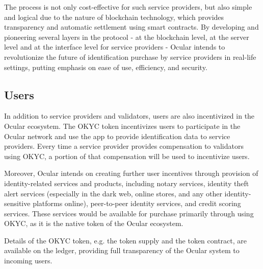 \documentclass[12pt]{article}
\begin{document}
The process is not only cost-effective for such service providers, but also simple and logical due to the nature of blockchain technology, which provides transparency and automatic settlement using smart contracts. By developing and pioneering several layers in the protocol - at the blockchain level, at the server level and at the interface level for service providers - Ocular intends to revolutionize the future of identification purchase by service providers in real-life settings, putting emphasis on ease of use, efficiency, and security.

\subsection{Users}
In addition to service providers and validators, users are also incentivized in the Ocular ecosystem. The OKYC token incentivizes users to participate in the Ocular network and use the app to provide identification data to service providers. Every time a service provider provides compensation to validators using OKYC, a portion of that compensation will be used to incentivize users.

Moreover, Ocular intends on creating further user incentives through provision of identity-related services and products, including notary services, identity theft alert services (especially in the dark web, online stores, and any other identity-sensitive platforms online), peer-to-peer identity services, and credit scoring services. These services would be available for purchase primarily through using OKYC, as it is the native token of the Ocular ecosystem.

Details of the OKYC token, e.g. the token supply and the token contract, are available on the ledger, providing full transparency of the Ocular system to incoming users. 
\end{document}
